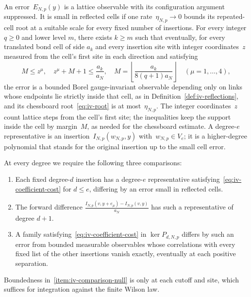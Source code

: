 \begin{definition}\label{def:iv-errors}
An error~$E_{N,p}(y)$ is a lattice observable with its configuration argument suppressed. It is small in reflected cells if one rate~$\eta_{N,p}\to0$ bounds its repeated-cell root at a suitable scale for every fixed number of insertions.
For every integer $q\ge0$ and lower level $m$, there exists $k\ge m$ such that eventually, for every translated bond cell of side $a_k$ and every insertion site with integer coordinates~$z$ measured from the cell's first site in each direction and satisfying
\begin{equation}\label{eq:iv-error-cells}
M\le z^\mu,\quad z^\mu+M+1\le \frac{a_k}{a_N},\quad
M=\left\lfloor\frac{a_k}{8(q+1)a_N}\right\rfloor
\quad(\mu=1,\ldots,4),
\end{equation}
the error is a bounded Borel gauge-invariant observable depending only on links whose endpoints lie strictly inside that cell, as in Definition~\ref{def:iv-reflections}, and its chessboard root~\eqref{eq:iv-root} is at most~$\eta_{N,p}$.
The integer coordinates~$z$ count lattice steps from the cell’s first site; the inequalities keep the support inside the cell by margin~$M$, as needed for the chessboard estimate.
A degree-$e$ representative is an insertion~$I_{N,p}(w_{N,p},y)$ with~$w_{N,p}\in V_e$; it is a higher-degree polynomial that stands for the original insertion up to the small cell error.
\end{definition}
At every degree we require the following three comparisons:
\begin{enumerate}[label=\textup{(C\arabic*)},ref=C\arabic*]
\item\label{item:iv-comparison-inclusion} Each fixed degree-$d$ insertion has a degree-$e$ representative satisfying~\eqref{eq:iv-coefficient-cost} for $d\le e$, differing by an error small in reflected cells.
\item\label{item:iv-comparison-difference} The forward difference $\frac{I_{N,p}(v,y+e_\mu)-I_{N,p}(v,y)}{a_N}$ has such a representative of degree $d+1$.
\item\label{item:iv-comparison-null} A family satisfying~\eqref{eq:iv-coefficient-cost} in $\ker P_{d,N,p}$ differs by such an error from bounded measurable observables whose correlations with every fixed list of the other insertions vanish exactly, eventually at each positive separation.
\end{enumerate}
Boundedness in~\ref{item:iv-comparison-null} is only at each cutoff and site, which suffices for integration against the finite Wilson law.

